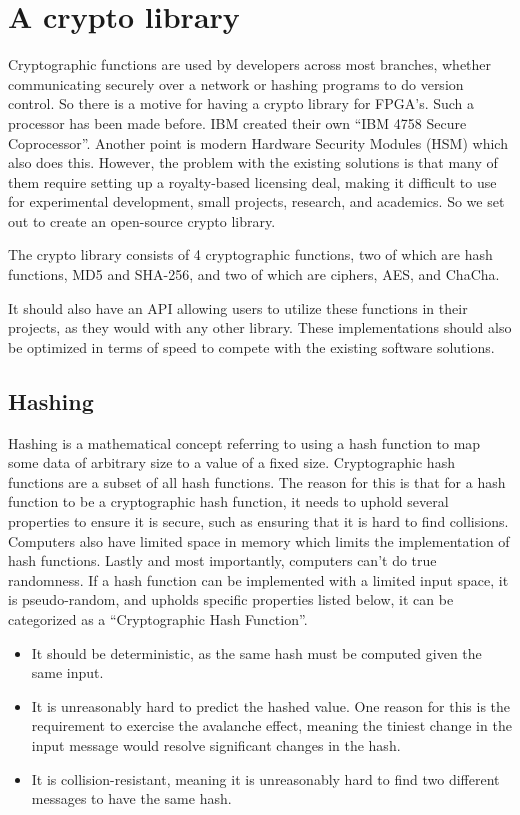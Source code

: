 \documentclass[a4paper, openany]{book}
\begin{document}
\section{A crypto library}
\label{sec:orgbad6785}
Cryptographic functions are used by developers across most branches, whether communicating securely over a network or hashing programs to do version control.
So there is a motive for having a crypto library for FPGA's. Such a processor has been made before. IBM created their own ``IBM 4758 Secure Coprocessor''\cite{IBM4758}. Another point is modern Hardware Security Modules (HSM) which also does this.
However, the problem with the existing solutions is that many of them require setting up a royalty-based licensing deal, making it difficult to use for experimental development, small projects, research, and academics.
So we set out to create an open-source crypto library.

The crypto library consists of 4 cryptographic functions, two of which are hash functions, MD5 and SHA-256, and two of which are ciphers, AES, and ChaCha.

It should also have an API allowing users to utilize these functions in their projects, as they would with any other library.
These implementations should also be optimized in terms of speed to compete with the existing software solutions.

\subsection{Hashing}
\label{sec:org7dcf2a1}
Hashing is a mathematical concept referring to using a hash function to map some data of arbitrary size to a value of a fixed size. Cryptographic hash functions are a subset of all hash functions.
The reason for this is that for a hash function to be a cryptographic hash function, it needs to uphold several properties to ensure it is secure, such as ensuring that it is hard to find collisions. Computers also have limited space in memory which limits the implementation of hash functions. Lastly and most importantly, computers can't do true randomness.
If a hash function can be implemented with a limited input space, it is pseudo-random, and upholds specific properties listed below, it can be categorized as a ``Cryptographic Hash Function''.
\begin{itemize}
\item It should be deterministic, as the same hash must be computed given the same input.
\item It is unreasonably hard to predict the hashed value. One reason for this is the requirement to exercise the avalanche effect, meaning the tiniest change in the input message would resolve significant changes in the hash.
\item It is collision-resistant, meaning it is unreasonably hard to find two different messages to have the same hash.
\end{itemize}
\end{document}
